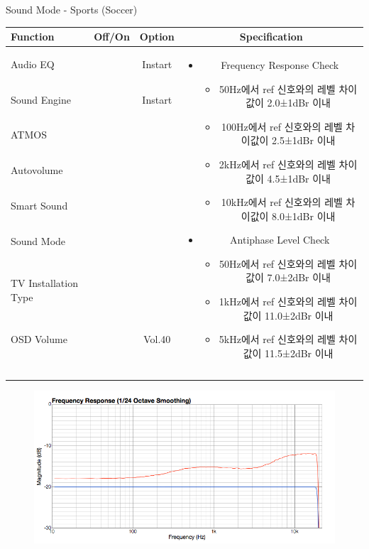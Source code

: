 \begin{frame}[t]{Sound Mode - Sports (Soccer)}
\begin{tiny}
\begin{tabular}{@{}lccc@{}}
\toprule
Function & Off/On & Option & Specification \\
\midrule
Audio EQ & \color{black}{Off} & Instart &
\multirow{10}{60mm}{
\begin{itemize}
\item Frequency Response Check
	\begin{itemize}
	\item 50Hz에서 ref 신호와의 레벨 차이값이 2.0±1dBr 이내
	\item 100Hz에서 ref 신호와의 레벨 차이값이 2.5±1dBr 이내
	\item 2kHz에서 ref 신호와의 레벨 차이값이 4.5±1dBr 이내
	\item 10kHz에서 ref 신호와의 레벨 차이값이 8.0±1dBr 이내
	\end{itemize}
\item Antiphase Level Check
	\begin{itemize}
	\item 50Hz에서 ref 신호와의 레벨 차이값이 7.0±2dBr 이내
	\item 1kHz에서 ref 신호와의 레벨 차이값이 11.0±2dBr 이내
	\item 5kHz에서 ref 신호와의 레벨 차이값이 11.5±2dBr 이내
	\end{itemize}
\end{itemize}
} \\
Sound Engine & \color{blue}{On} & Instart & \\
ATMOS & \color{black}{Off}  & & \\
Autovolume & \color{black}{Off} & & \\
Smart Sound & \color{black}{Off} & & \\
Sound Mode & \color{blue}{On} & \color{blue}{Sports} & \\
TV Installation Type & \color{blue}{On} & \color{black}{Standtype1} & \\
OSD Volume & \color{blue}{On} & Vol.40 & \\
& & & \\
& & & \\
& & & \\
& & & \\
\midrule
\end{tabular}
\end{tiny}

\begin{figure}[b]
\includegraphics[height=0.3\textwidth]{figures/sports.png}
\end{figure}

\end{frame}
